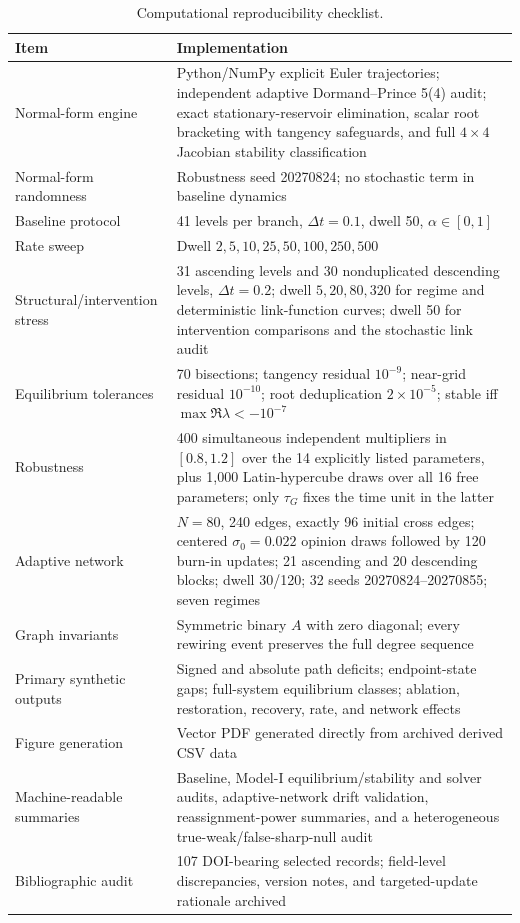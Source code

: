 \documentclass[10pt,a4paper]{article}
\begin{document}
\begin{appendices}
\begin{table}[!htbp]
\centering
\caption{Computational reproducibility checklist.}
\label{tab:reproducibility}
\small
\begin{tabularx}{\textwidth}{|p{3.7cm}|Y|}
\hline
\textbf{Item} & \textbf{Implementation}\\
\hline
Normal-form engine & Python/NumPy explicit Euler trajectories; independent adaptive Dormand--Prince 5(4) audit; exact stationary-reservoir elimination, scalar root bracketing with tangency safeguards, and full $4\times4$ Jacobian stability classification\\
\hline
Normal-form randomness & Robustness seed 20270824; no stochastic term in baseline dynamics\\
\hline
Baseline protocol & 41 levels per branch, $\Delta t=0.1$, dwell 50, $\alpha\in[0,1]$\\
\hline
Rate sweep & Dwell $2,5,10,25,50,100,250,500$\\
\hline
Structural/intervention stress & 31 ascending levels and 30 nonduplicated descending levels, $\Delta t=0.2$; dwell $5,20,80,320$ for regime and deterministic link-function curves; dwell 50 for intervention comparisons and the stochastic link audit\\
\hline
Equilibrium tolerances & 70 bisections; tangency residual $10^{-9}$; near-grid residual $10^{-10}$; root deduplication $2\times10^{-5}$; stable iff $\max\Re\lambda<-10^{-7}$\\
\hline
Robustness & 400 simultaneous independent multipliers in $[0.8,1.2]$ over the 14 explicitly listed parameters, plus 1,000 Latin-hypercube draws over all 16 free parameters; only $\tau_G$ fixes the time unit in the latter\\
\hline
Adaptive network & $N=80$, 240 edges, exactly 96 initial cross edges; centered $\sigma_0=0.022$ opinion draws followed by 120 burn-in updates; 21 ascending and 20 descending blocks; dwell 30/120; 32 seeds 20270824--20270855; seven regimes\\
\hline
Graph invariants & Symmetric binary $A$ with zero diagonal; every rewiring event preserves the full degree sequence\\
\hline
Primary synthetic outputs & Signed and absolute path deficits; endpoint-state gaps; full-system equilibrium classes; ablation, restoration, recovery, rate, and network effects\\
\hline
Figure generation & Vector PDF generated directly from archived derived CSV data\\
\hline
Machine-readable summaries & Baseline, Model-I equilibrium/stability and solver audits, adaptive-network drift validation, reassignment-power summaries, and a heterogeneous true-weak/false-sharp-null audit\\
\hline
Bibliographic audit & 107 DOI-bearing selected records; field-level discrepancies, version notes, and targeted-update rationale archived\\
\hline
\end{tabularx}
\end{table}


\end{appendices}
\end{document}
